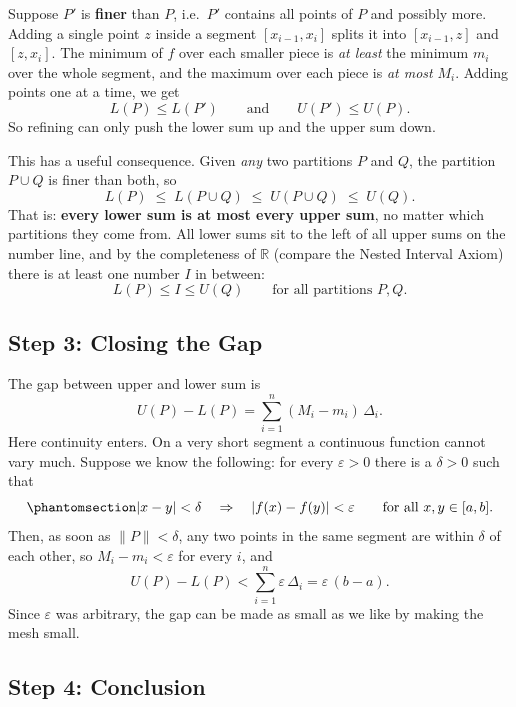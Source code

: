 \documentclass[
  letterpaper,
  DIV=11,
  numbers=noendperiod]{scrreprt}
\theoremstyle{plain}
\theoremstyle{plain}
\theoremstyle{definition}
\theoremstyle{definition}
\theoremstyle{definition}
\theoremstyle{plain}
\theoremstyle{plain}
\theoremstyle{remark}
\begin{document}
Suppose \(P'\) is \textbf{finer} than \(P\), i.e.~\(P'\) contains all
points of \(P\) and possibly more. Adding a single point \(z\) inside a
segment \([x_{i-1},x_i]\) splits it into \([x_{i-1},z]\) and
\([z,x_i]\). The minimum of \(f\) over each smaller piece is \emph{at
least} the minimum \(m_i\) over the whole segment, and the maximum over
each piece is \emph{at most} \(M_i\). Adding points one at a time, we
get \[
L(P) \le L(P') \qquad\text{and}\qquad U(P') \le U(P).
\] So refining can only push the lower sum up and the upper sum down.

This has a useful consequence. Given \emph{any} two partitions \(P\) and
\(Q\), the partition \(P\cup Q\) is finer than both, so \[
L(P) \;\le\; L(P\cup Q) \;\le\; U(P\cup Q) \;\le\; U(Q).
\] That is: \textbf{every lower sum is at most every upper sum}, no
matter which partitions they come from. All lower sums sit to the left
of all upper sums on the number line, and by the completeness of
\(\mathbb{R}\) (compare the Nested Interval Axiom) there is at least one
number \(I\) in between: \[
L(P) \le I \le U(Q) \qquad\text{for all partitions } P, Q.
\]

\subsection{Step 3: Closing the Gap}\label{step-3-closing-the-gap}

The gap between upper and lower sum is \[
U(P) - L(P) = \sum_{i=1}^n (M_i - m_i)\,\Delta_i.
\] Here continuity enters. On a very short segment a continuous function
cannot vary much. Suppose we know the following: for every
\(\varepsilon>0\) there is a \(\delta>0\) such that
\begin{equation}\protect\phantomsection\label{eq-uniform-continuity}{
\lvert x-y \rvert<\delta \quad \Rightarrow \quad\lvert f(x)-f(y) \rvert<\varepsilon\qquad\text{for all } x,y\in[a,b].
}\end{equation} Then, as soon as \(\|P\|<\delta\), any two points in the
same segment are within \(\delta\) of each other, so
\(M_i - m_i<\varepsilon\) for every \(i\), and \[
U(P) - L(P) < \sum_{i=1}^n \varepsilon\,\Delta_i = \varepsilon\,(b-a).
\] Since \(\varepsilon\) was arbitrary, the gap can be made as small as
we like by making the mesh small.

\subsection{Step 4: Conclusion}\label{step-4-conclusion}
\end{document}
